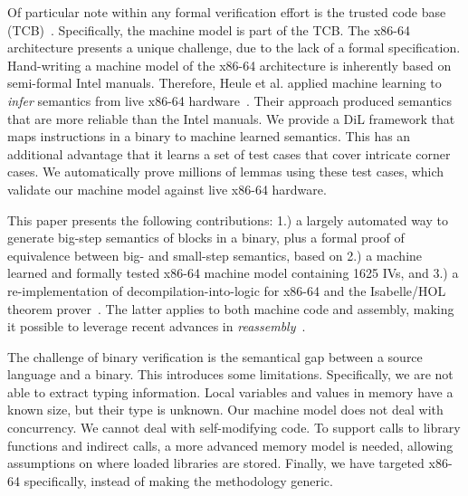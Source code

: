 
Of particular note within any formal verification effort is the trusted code base (TCB)~\cite{kumarsoftware}.
Specifically, the machine model is part of the TCB.
The x86-64 architecture presents a unique challenge, due to the lack of a formal specification.
Hand-writing a machine model of the x86-64 architecture is inherently based on semi-formal Intel manuals. 
Therefore, Heule et al. applied machine learning to \emph{infer} semantics from live x86-64 hardware~\cite{heule2016}.
Their approach produced semantics that are more reliable than the Intel manuals.
We provide a DiL framework that maps instructions in a binary to machine learned semantics.
This has an additional advantage that it learns a set of test cases that cover intricate corner cases.
We automatically prove millions of lemmas using these test cases, which validate our machine model against live x86-64 hardware.

This paper presents the following contributions: 1.) a largely automated way to generate big-step semantics of blocks in a binary, plus a formal proof of equivalence between big- and small-step semantics, based on 2.) a machine learned and formally tested x86-64 machine model containing 1625 IVs, and 3.) a re-implementation of decompilation-into-logic for x86-64 and the Isabelle/HOL theorem prover~\cite{nipkow2002isabelle,dawson2009isabelle}.
The latter applies to both machine code and assembly, making it possible to leverage recent advances in \emph{reassembly}~\cite{wang2017ramblr}.

The challenge of binary verification is the semantical gap between a source language and a binary.
This introduces some limitations.
Specifically, we are not able to extract typing information.
Local variables and values in memory have a known size, but their type is unknown.
Our machine model does not deal with concurrency.
We cannot deal with self-modifying code.
To support calls to library functions and indirect calls, a more advanced memory model is needed, allowing assumptions on where loaded libraries are stored.
Finally, we have targeted x86-64 specifically, instead of making the methodology generic.


